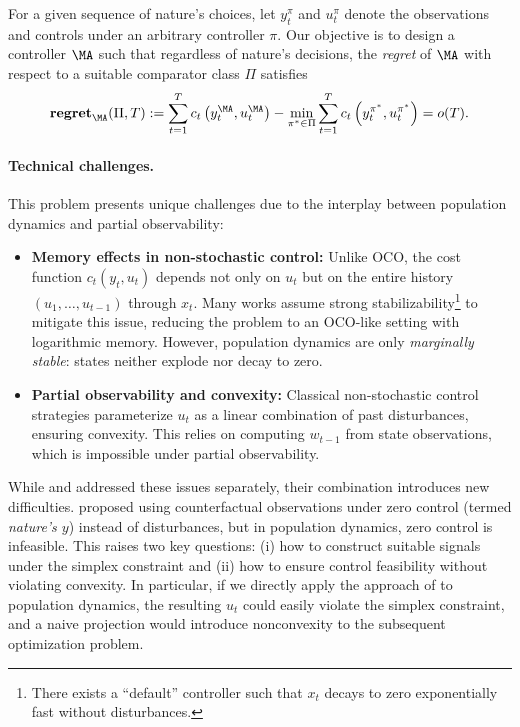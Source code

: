 For a given sequence of nature’s choices, let $y^\pi_t$ and $u^\pi_t$ denote the observations and controls under an arbitrary controller $\pi$. Our objective is to design a controller $\MA$ such that regardless of nature's decisions, the \emph{regret} of $\MA$ with respect to a suitable comparator class $\Pi$ satisfies 
\begin{equation*}
\breg_\MA(\Pi,T):=\sum_{t=1}^Tc_t\left(y_t^{\MA},u_t^{\MA}\right)-\min_{\pi^*\in \Pi}\sum_{t=1}^T c_t\left(y_t^{\pi^*},u_t^{\pi^*}\right)=o(T).
\end{equation*}


\paragraph{Technical challenges.} This problem presents unique challenges due to the interplay between population dynamics and partial observability:
\begin{itemize}
\item \textbf{Memory effects in non-stochastic control:} Unlike OCO, the cost function $c_t(y_t, u_t)$ depends not only on $u_t$ but on the entire history $(u_1, \dots, u_{t-1})$ through $x_t$. Many works assume strong stabilizability\footnote{There exists a
“default” controller such that $x_t$ decays to zero exponentially fast without disturbances.} to mitigate this issue, reducing the problem to an OCO-like setting with logarithmic memory. However, population dynamics are only \emph{marginally stable}: states neither explode nor decay to zero.
\item \textbf{Partial observability and convexity:} Classical non-stochastic control strategies parameterize $u_t$ as a linear combination of past disturbances, ensuring convexity. This relies on computing $w_{t-1}$ from state observations, which is impossible under partial observability.
\end{itemize}

While \cite{golowich2024online} and \cite{simchowitz2020improper} addressed these issues separately, their combination introduces new difficulties. \cite{simchowitz2020improper} proposed using counterfactual observations under zero control (termed \emph{nature’s $y$}) instead of disturbances, but in population dynamics, zero control is infeasible. This raises two key questions: (i) how to construct suitable signals under the simplex constraint and (ii) how to ensure control feasibility without violating convexity. In particular, if we directly apply the approach of \cite{simchowitz2020improper} to population dynamics, the resulting $u_t$ could easily violate the simplex constraint, and a naive projection would introduce nonconvexity to the subsequent optimization problem. 

